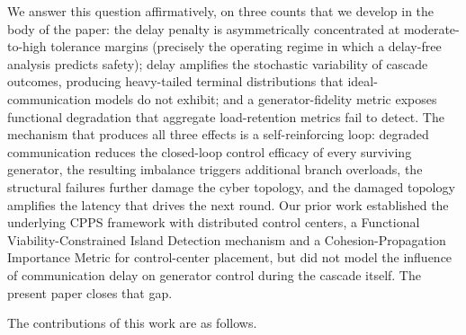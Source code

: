 We answer this question affirmatively, on three counts that we
develop in the body of the paper: the delay penalty is asymmetrically
concentrated at moderate-to-high tolerance margins (precisely the
operating regime in which a delay-free analysis predicts safety);
delay amplifies the stochastic variability of cascade outcomes,
producing heavy-tailed terminal distributions that ideal-communication
models do not exhibit; and a generator-fidelity metric exposes
functional degradation that aggregate load-retention metrics fail to
detect.  The mechanism that produces all three effects is a
self-reinforcing loop: degraded communication reduces the closed-loop
control efficacy of every surviving generator, the resulting
imbalance triggers additional branch overloads, the structural
failures further damage the cyber topology, and the damaged topology
amplifies the latency that drives the next round.  Our prior work
\citep{ChenTu2026} established the underlying CPPS framework with
distributed control centers, a Functional Viability-Constrained
Island Detection mechanism and a Cohesion-Propagation Importance
Metric for control-center placement, but did not model the
influence of communication delay on generator control during the
cascade itself.  The present paper closes that gap.

The contributions of this work are as follows.


